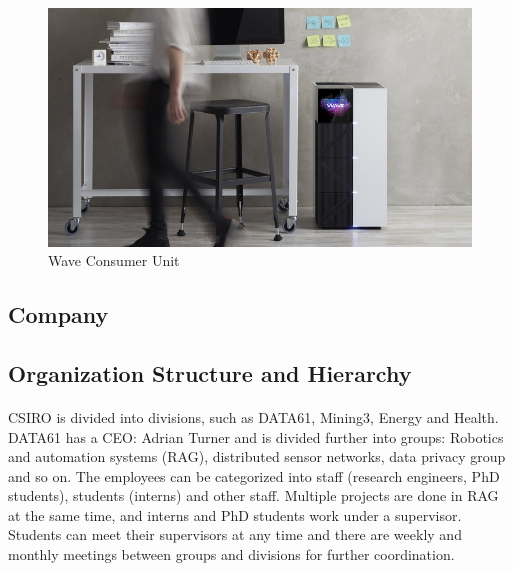 \begin{figure}[h]
    \centering
    \includegraphics[trim=0cm 0cm 0cm 0cm, clip=true,scale=1]{figures/wave_lab.jpg}
    \caption{Wave Consumer Unit\label{Fig:wavelab}}\vspace{-4mm}
    \end{figure}

\subsection{Company}

\subsection{Organization Structure and Hierarchy}

\paragraph{}
CSIRO is divided into divisions, such as DATA61, Mining3, Energy and Health. DATA61 has a CEO: Adrian Turner and is divided further into groups: Robotics and automation systems (RAG), distributed sensor networks, data privacy group and so on. The employees can be categorized into staff (research engineers, PhD students), students (interns) and other staff. Multiple projects are done in RAG at the same time, and interns and PhD students work under a supervisor. Students can meet their supervisors at any time and there are weekly and monthly meetings between groups and divisions for further coordination.

